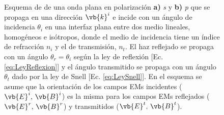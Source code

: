\begin{figure}[h!]
\begin{subfigure}{.43\textwidth}
	\end{subfigure} 
	\caption{ Esquema de de una onda plana en polarización \textbf{a)} \emph{s} y \textbf{b)} \emph{p} que se propaga en una dirección $\vb{k}^i$ e incide con un ángulo de incidencia $\theta_i$ en una interfaz plana entre dos medio lineales, homogéneos e isótropos, donde el medio de incidencia tiene un índice de refracción $n_i$ y el de transmisión, $n_t$. El haz reflejado se propaga con un ángulo $\theta_r=\theta_i$ según la ley de reflexión [Ec. \eqref{eq:LeyReflexion}] y el ángulo transmitido se propaga con un ángulo $\theta_t$ dado por la ley de Snell [Ec. \eqref{eq:LeySnell}]. En el esquema se asume que la orientación de los campos EMs incidentes  ($\vb{E}^i,\,\vb{B}^i$) es la misma para los campos EMs reflejados ($\vb{E}^r,\,\vb{B}^r$) y transmitidos ($\vb{E}^t,\,\vb{B}^t$).}	\label{fig:Polarizaciones}	
	\end{figure}	
%

